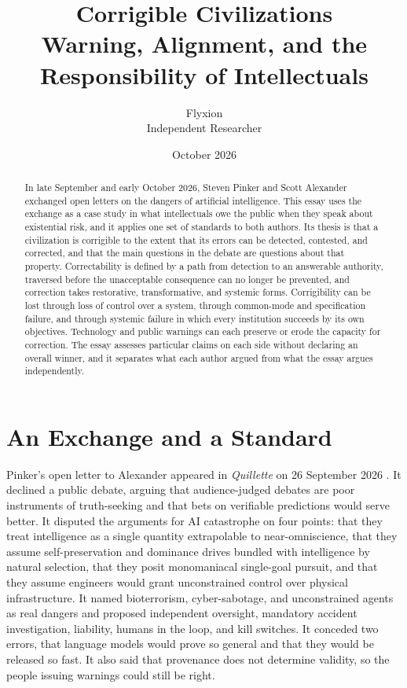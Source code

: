 \documentclass[11pt]{article}
\title{Corrigible Civilizations\\[0.4em]\large Warning, Alignment, and the Responsibility of Intellectuals}
\author{Flyxion\\Independent Researcher}
\date{October 2026}
\begin{document}
\maketitle

\begin{abstract}
\noindent
In late September and early October 2026, Steven Pinker and Scott Alexander exchanged open letters on the dangers of artificial intelligence. This essay uses the exchange as a case study in what intellectuals owe the public when they speak about existential risk, and it applies one set of standards to both authors. Its thesis is that a civilization is corrigible to the extent that its errors can be detected, contested, and corrected, and that the main questions in the debate are questions about that property. Correctability is defined by a path from detection to an answerable authority, traversed before the unacceptable consequence can no longer be prevented, and correction takes restorative, transformative, and systemic forms. Corrigibility can be lost through loss of control over a system, through common-mode and specification failure, and through systemic failure in which every institution succeeds by its own objectives. Technology and public warnings can each preserve or erode the capacity for correction. The essay assesses particular claims on each side without declaring an overall winner, and it separates what each author argued from what the essay argues independently.
\end{abstract}

\section{An Exchange and a Standard}

Pinker's open letter to Alexander appeared in \emph{Quillette} on 26 September 2026 \cite{pinker2026}. It declined a public debate, arguing that audience-judged debates are poor instruments of truth-seeking and that bets on verifiable predictions would serve better. It disputed the arguments for AI catastrophe on four points: that they treat intelligence as a single quantity extrapolable to near-omniscience, that they assume self-preservation and dominance drives bundled with intelligence by natural selection, that they posit monomaniacal single-goal pursuit, and that they assume engineers would grant unconstrained control over physical infrastructure. It named bioterrorism, cyber-sabotage, and unconstrained agents as real dangers and proposed independent oversight, mandatory accident investigation, liability, humans in the loop, and kill switches. It conceded two errors, that language models would prove so general and that they would be released so fast. It also said that provenance does not determine validity, so the people issuing warnings could still be right.
\end{document}
